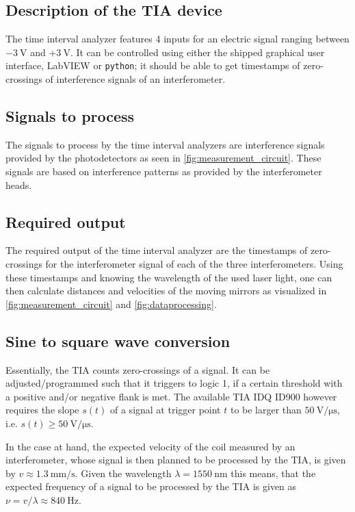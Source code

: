 \documentclass{report}
\numberwithin{tm}{section}
\begin{document}
\subsection{Description of the TIA device}
The time interval analyzer features 4 inputs for an electric signal ranging between $-\SI{3}{\volt}$ and $+\SI{3}{\volt}$. It can be controlled using either the shipped graphical user interface, LabVIEW or \verb|python|; it should be able to get timestamps of zero-crossings of interference signals of an interferometer.

\subsection{Signals to process}
The signals to process by the time interval analyzers are interference signals provided by the photodetectors as seen in \cref{fig:measurement_circuit}. These signals are based on interference patterns as provided by the interferometer heads.

\subsection{Required output}
The required output of the time interval analyzer are the timestamps of zero-crossings for the interferometer signal of each of the three interferometers. Using these timestamps and knowing the wavelength of the used laser light, one can then calculate distances and velocities of the moving mirrors as visualized in \cref{fig:measurement_circuit} and \cref{fig:dataprocessing}.

\subsection{Sine to square wave conversion}
Essentially, the TIA counts zero-crossings of a signal. It can be adjusted/programmed such that it triggers to logic 1, if a certain threshold with a positive and/or negative flank is met. The available TIA IDQ ID900 however requires the slope $s(t)$ of a signal at trigger point $t$ to be larger than $\SI{50}{\volt\per\micro\second}$, i.e. $s(t) \geq \SI{50}{\volt\per\micro\second}$.

In the case at hand, the expected velocity of the coil measured by an interferometer, whose signal is then planned to be processed by the TIA, is given by $v \approx \SI{1.3}{\milli\meter\per\second}$. Given the wavelength $\lambda = \SI{1550}{\nano\meter}$ this means, that the expected frequency of a signal to be processed by the TIA is given as $\nu = v/\lambda \approx \SI{840}{\hertz}$.
\end{document}
